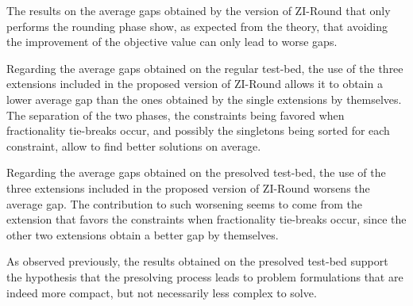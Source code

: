 \documentclass[a4paper,12pt,twoside]{scrbook}
\begin{document}
The results on the average gaps obtained by the version of ZI-Round that only performs the rounding phase show, as expected from the theory, that avoiding the improvement of the objective value can only lead to worse gaps. \par 

Regarding the average gaps obtained on the regular test-bed, the use of the three extensions included in the proposed version of ZI-Round allows it to obtain a lower average gap than the ones obtained by the single extensions by themselves. The separation of the two phases, the constraints being favored when fractionality tie-breaks occur, and possibly the singletons being sorted for each constraint, allow to find better solutions on average. \par 

Regarding the average gaps obtained on the presolved test-bed, the use of the three extensions included in the proposed version of ZI-Round worsens the average gap. The contribution to such worsening seems to come from the extension that favors the constraints when fractionality tie-breaks occur, since the other two extensions obtain a better gap by themselves. \par 

As observed previously, the results obtained on the presolved test-bed support the hypothesis that the presolving process leads to problem formulations that are indeed more compact, but not necessarily less complex to solve.
\end{document}
